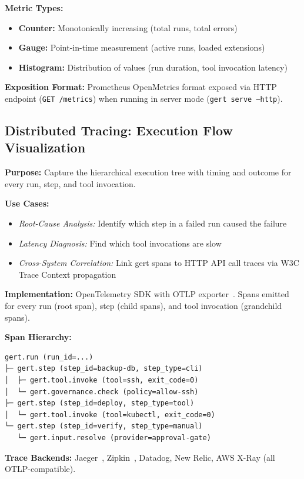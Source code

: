 \textbf{Metric Types:}
\begin{itemize}
  \item \textbf{Counter:} Monotonically increasing (total runs, total errors)
  \item \textbf{Gauge:} Point-in-time measurement (active runs, loaded extensions)
  \item \textbf{Histogram:} Distribution of values (run duration, tool invocation latency)
\end{itemize}

\textbf{Exposition Format:} Prometheus OpenMetrics format exposed via HTTP endpoint (\texttt{GET /metrics}) when running in server mode (\texttt{gert serve --http}).

\subsection{Distributed Tracing: Execution Flow Visualization}

\textbf{Purpose:} Capture the hierarchical execution tree with timing and outcome for every run, step, and tool invocation.

\textbf{Use Cases:}
\begin{itemize}
  \item \textit{Root-Cause Analysis:} Identify which step in a failed run caused the failure
  \item \textit{Latency Diagnosis:} Find which tool invocations are slow
  \item \textit{Cross-System Correlation:} Link gert spans to HTTP API call traces via W3C Trace Context propagation
\end{itemize}

\textbf{Implementation:} OpenTelemetry SDK with OTLP exporter~\cite{otel-spec}. Spans emitted for every run (root span), step (child spans), and tool invocation (grandchild spans).

\textbf{Span Hierarchy:}
\begin{verbatim}
gert.run (run_id=...)
├─ gert.step (step_id=backup-db, step_type=cli)
│  ├─ gert.tool.invoke (tool=ssh, exit_code=0)
│  └─ gert.governance.check (policy=allow-ssh)
├─ gert.step (step_id=deploy, step_type=tool)
│  └─ gert.tool.invoke (tool=kubectl, exit_code=0)
└─ gert.step (step_id=verify, step_type=manual)
   └─ gert.input.resolve (provider=approval-gate)
\end{verbatim}

\textbf{Trace Backends:} Jaeger~\cite{jaeger-docs}, Zipkin~\cite{zipkin-docs}, Datadog, New Relic, AWS X-Ray (all OTLP-compatible).

